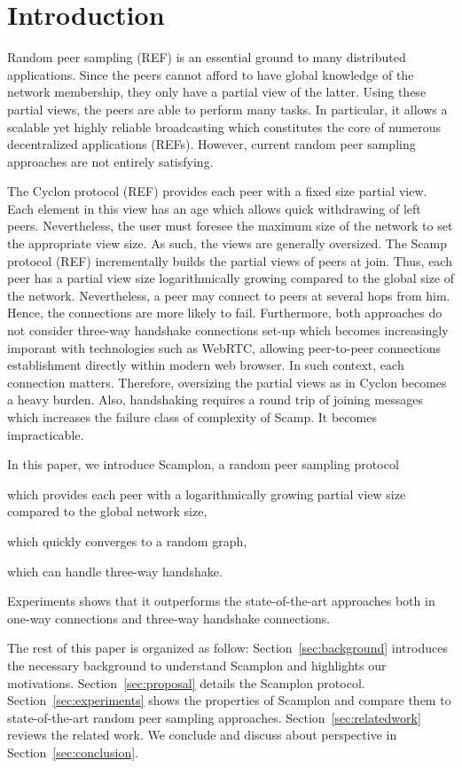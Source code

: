 
\section{Introduction}
Random peer sampling (REF) is an essential ground to many distributed
applications. Since the peers cannot afford to have global knowledge of the
network membership, they only have a partial view of the latter. Using these
partial views, the peers are able to perform many tasks. In particular, it
allows a scalable yet highly reliable broadcasting which constitutes the core
of numerous decentralized applications (REFs). However, current random peer
sampling approaches are not entirely satisfying. 

The Cyclon protocol (REF) provides each peer with a fixed size partial view.
Each element in this view has an age which allows quick withdrawing of left
peers. Nevertheless, the user must foresee the maximum size of the network to
set the appropriate view size. As such, the views are generally oversized.  The
Scamp protocol (REF) incrementally builds the partial views of peers at
join. Thus, each peer has a partial view size logarithmically growing compared
to the global size of the network. Nevertheless, a peer may connect to peers at
several hops from him. Hence, the connections are more likely to fail.
Furthermore, both approaches do not consider three-way handshake connections
set-up which becomes increasingly imporant with technologies such as WebRTC,
allowing peer-to-peer connections establishment directly within modern web
browser. In such context, each connection matters. Therefore, oversizing the
partial views as in Cyclon becomes a heavy burden. Also, handshaking requires a
round trip of joining messages which increases the failure class of complexity
of Scamp. It becomes impracticable.

In this paper, we introduce Scamplon, a random peer sampling protocol
\begin{inparaenum}[(i)]
\item which provides each peer with a logarithmically growing partial view size
  compared to the global network size,
\item which quickly converges to a random graph,
\item which can handle three-way handshake.
\end{inparaenum}
Experiments shows that it outperforms the state-of-the-art approaches both in
one-way connections and three-way handshake connections.

The rest of this paper is organized as follow: Section~\ref{sec:background}
introduces the necessary background to understand Scamplon and highlights our
motivations. Section~\ref{sec:proposal} details the Scamplon protocol.
Section~\ref{sec:experiments} shows the properties of Scamplon and compare them
to state-of-the-art random peer sampling
approaches. Section~\ref{sec:relatedwork} reviews the related work. We conclude
and discuss about perspective in Section~\ref{sec:conclusion}.

